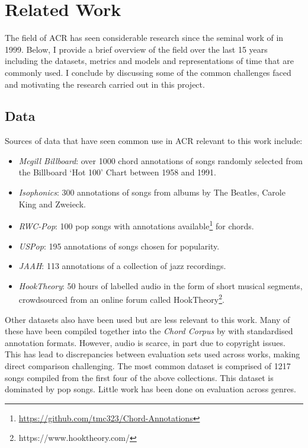 \section{Related Work}\label{sec:related_work}

The field of ACR has seen considerable research since the seminal work of \citet{FujishimaACR} in 1999. Below, I provide a brief overview of the field over the last 15 years including the datasets, metrics and models and representations of time that are commonly used. I conclude by discussing some of the common challenges faced and motivating the research carried out in this project. 

\subsection{Data}\label{sec:background-data}

Sources of data that have seen common use in ACR relevant to this work include:

\begin{itemize}
    \item \emph{Mcgill Billboard}: over 1000 chord annotations of songs randomly selected from the Billboard `Hot 100' Chart between 1958 and 1991.~\citep{McgillBillboard}
    \item \emph{Isophonics}: 300 annotations of songs from albums by The Beatles, Carole King and Zweieck.~\citep{Isophonics}
    \item \emph{RWC-Pop}: 100 pop songs with annotations available\footnote{\url{https://github.com/tmc323/Chord-Annotations}} for chords.~\citep{RWC}
    \item \emph{USPop}: 195 annotations of songs chosen for popularity.~\citep{USPop}
    \item \emph{JAAH}: 113 annotations of a collection of jazz recordings.~\citep{JAAH}
    \item \emph{HookTheory}: 50 hours of labelled audio in the form of short musical segments, crowdsourced from an online forum called HookTheory\footnote{https://www.hooktheory.com/}.~\citep{MelodyTranscriptionViaGenerativePreTraining}
\end{itemize}

Other datasets also have been used but are less relevant to this work. Many of these have been compiled together into the \emph{Chord Corpus} by \citet{Choco} with standardised annotation formats. However, audio is scarce, in part due to copyright issues. This has lead to discrepancies between evaluation sets used across works, making direct comparison challenging. The most common dataset is comprised of 1217 songs compiled from the first four of the above collections. This dataset is dominated by pop songs. Little work has been done on evaluation across genres.


